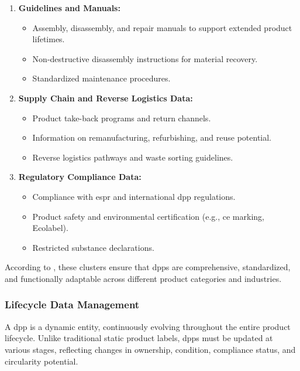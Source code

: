 \begin{enumerate}[itemsep=0.5\baselineskip]
    \item \textbf{Guidelines and Manuals:}  
    \vspace{5pt}
    \begin{itemize}
        \item Assembly, disassembly, and repair manuals to support extended product lifetimes.
        \item Non-destructive disassembly instructions for material recovery.
        \item Standardized maintenance procedures.
    \end{itemize}

    \item \textbf{Supply Chain and Reverse Logistics Data:}  
    \vspace{5pt}
    \begin{itemize}
        \item Product take-back programs and return channels.
        \item Information on remanufacturing, refurbishing, and reuse potential.
        \item Reverse logistics pathways and waste sorting guidelines.
    \end{itemize}

    \item \textbf{Regulatory Compliance Data:}  
    \vspace{5pt}
    \begin{itemize}
        \item Compliance with \ac{espr} and international \ac{dpp} regulations.
        \item Product safety and environmental certification (e.g., \ac{ce} marking, Ecolabel).
        \item Restricted substance declarations.
    \end{itemize}
\end{enumerate}

According to \textcite{Jensen.2023}, these clusters ensure that \ac{dpp}s are comprehensive, standardized, and functionally adaptable across different product categories and industries.

\subsubsection*{Lifecycle Data Management}
A \ac{dpp} is a dynamic entity, continuously evolving throughout the entire product lifecycle. Unlike traditional static product labels, \ac{dpp}s must be updated at various stages, reflecting changes in ownership, condition, compliance status, and circularity potential. \autocite{Jensen.2023}

